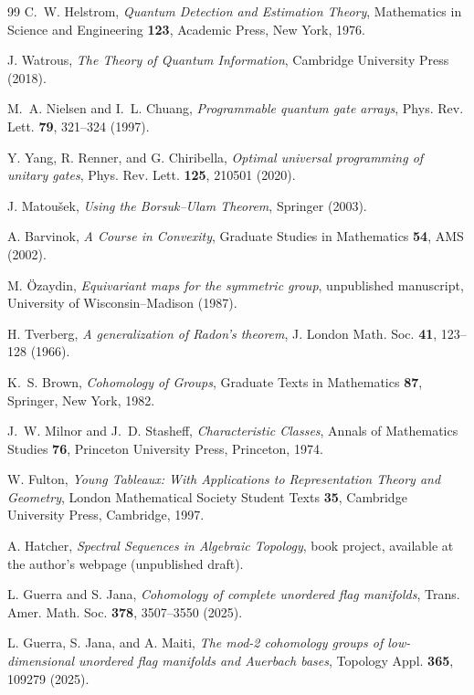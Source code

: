 \documentclass[11pt,a4paper]{article}
\begin{document}
\begin{thebibliography}{99}
C.~W. Helstrom, \emph{Quantum Detection and Estimation Theory}, Mathematics in Science and Engineering \textbf{123}, Academic Press, New York, 1976.

J. Watrous, \emph{The Theory of Quantum Information}, Cambridge University Press (2018).

M.~A. Nielsen and I.~L. Chuang, \emph{Programmable quantum gate arrays}, Phys. Rev. Lett. \textbf{79}, 321--324 (1997).

Y. Yang, R. Renner, and G. Chiribella, \emph{Optimal universal programming of unitary gates}, Phys. Rev. Lett. \textbf{125}, 210501 (2020).

J. Matou{\v{s}}ek, \emph{Using the Borsuk--Ulam Theorem}, Springer (2003).

A. Barvinok, \emph{A Course in Convexity}, Graduate Studies in Mathematics \textbf{54}, AMS (2002).

M. {\"O}zaydin, \emph{Equivariant maps for the symmetric group}, unpublished manuscript, University of Wisconsin--Madison (1987).

H. Tverberg, \emph{A generalization of Radon's theorem}, J. London Math. Soc. \textbf{41}, 123--128 (1966).

K.~S. Brown, \emph{Cohomology of Groups}, Graduate Texts in Mathematics \textbf{87}, Springer, New York, 1982.

J.~W. Milnor and J.~D. Stasheff, \emph{Characteristic Classes}, Annals of Mathematics Studies \textbf{76}, Princeton University Press, Princeton, 1974.

W. Fulton, \emph{Young Tableaux: With Applications to Representation Theory and Geometry}, London Mathematical Society Student Texts \textbf{35}, Cambridge University Press, Cambridge, 1997.

A. Hatcher, \emph{Spectral Sequences in Algebraic Topology}, book project,
available at the author's webpage (unpublished draft).

L. Guerra and S. Jana, \emph{Cohomology of complete unordered flag manifolds},
Trans. Amer. Math. Soc. \textbf{378}, 3507--3550 (2025).

L. Guerra, S. Jana, and A. Maiti, \emph{The mod-2 cohomology groups of
low-dimensional unordered flag manifolds and Auerbach bases},
Topology Appl. \textbf{365}, 109279 (2025).


\end{thebibliography}
\end{document}
